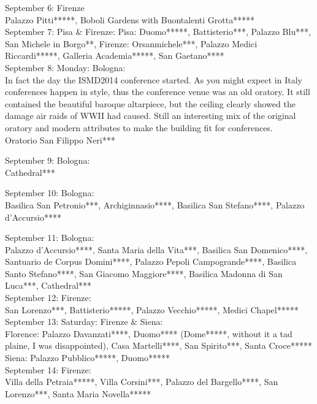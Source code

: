 September 6: Firenze\\
Palazzo Pitti*****, Boboli Gardens with Buontalenti Grotta*****\\

September 7: Pisa \& Firenze:
Pisa: Duomo*****, Battisterio***, Palazzo Blu***, San Michele in Borgo**, Firenze: Orsanmichele***, Palazzo Medici Riccardi*****, Galleria Academia*****, San Gaetano****\\

September 8: Monday: Bologna:\\
In fact the day the ISMD2014 conference started. As you might expect in Italy conferences happen in style, thus the conference venue was an old oratory. It still contained the beautiful baroque altarpiece, but the ceiling clearly showed the damage air raids of WWII had caused. Still an interesting mix of the original oratory and modern attributes to make the building fit for conferences.\\

Oratorio San Filippo Neri***

September 9: Bologna:\\
Cathedral***

September 10: Bologna:\\
Basilica San Petronio***, Archiginnasio****, Basilica San Stefano****, Palazzo d'Accursio****

September 11: Bologna:\\
Palazzo d'Accursio****, Santa Maria della Vita***, Basilica San Domenico****, Santuario de Corpus Domini****, Palazzo Pepoli Campogrande****, Basilica Santo Stefano****, San Giacomo Maggiore****, Basilica Madonna di San Luca***, Cathedral***\\

September 12: Firenze:\\
San Lorenzo***, Battisterio*****,  Palazzo Vecchio*****, Medici Chapel*****\\

September 13: Saturday: Firenze \& Siena:\\
Florence: Palazzo Davanzati****, Duomo**** (Dome*****, without it a tad plaine, I was disappointed), Casa Martelli****, San Spirito***, Santa Croce*****
Siena: Palazzo Pubblico*****, Duomo*****\\

September 14: Firenze:\\
Villa della Petraia*****, Villa Corsini***, Palazzo del Bargello****, San Lorenzo***, Santa Maria Novella*****

